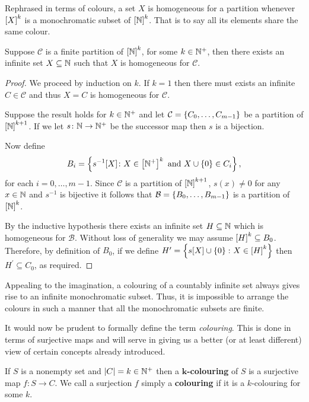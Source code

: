 Rephrased in terms of colours, a set $X$ is homogeneous for a partition whenever
$\subsets{k}{X}$ is a monochromatic subset of $\subsets{k}{\nats}$.  That is to
say all its elements share the same colour.

\begin{thm}
	Suppose $\mathcal{C}$ is a finite partition of $\subsets{k}{\nats}$, for
	some $k\in\posnats$, then there exists an infinite set $X\subseteq\nats$
	such that $X$ is homogeneous for $\mathcal{C}$.
\end{thm}
\begin{proof}
	We proceed by induction on $k$. If $k=1$ then there must exists an infinite
	$C\in\mathcal{C}$ and thus $X=C$ is homogeneous for $\mathcal{C}$.

	Suppose the result holds for $k\in\posnats$ and let
	$\mathcal{C}=\set{C_0,\dotsc,C_{m-1}}$ be a partition of
	$\subsets{k+1}{\nats}$.  If we let $s\colon\nats\to\posnats$
	be the successor map then $s$ is a bijection.

	Now define
	\begin{equation}
		B_i=\setbuild{s^{-1}[X]}{X\in\subsets{k}{\posnats}\text{ and
		}X\cup\set{0}\in C_i},
	\end{equation}
	for each $i=0,\dotsc,m-1$.  Since $\mathcal{C}$ is a partition of
	$\subsets{k+1}{\nats}$, $s(x)\neq 0$ for any $x\in\nats$ and $s^{-1}$ is
	bijective it follows that $\mathcal{B}=\set{B_0,\dotsc,B_{m-1}}$ is a
	partition of $\subsets{k}{\nats}$.

	By the inductive hypothesis there exists an infinite set $H\subseteq\nats$
	which is homogeneous for $\mathcal{B}$.  Without loss of generality we may
	assume $\subsets{k}{H}\subseteq B_0$.  Therefore, by definition of $B_0$,
	if we define $H^\prime=\setbuild{s[X]\cup\set{0}}{X\in\subsets{k}{H}}$ then
	$H^\prime\subseteq C_0$, as required.
\end{proof}

Appealing to the imagination, a colouring of a countably infinite set always
gives rise to an infinite monochromatic subset.  Thus, it is impossible to
arrange the colours in such a manner that all the monochromatic subsets are
finite.

It would now be prudent to formally define the term \textit{colouring}.  This is
done in terms of surjective maps and will serve in giving us a better (or at
least different) view of certain concepts already introduced.

\begin{dfn}[Colouring]\label{def:Col}
	If $S$ is a nonempty set and $\card{C}=k\in\posnats$ then a
	$\mathbf{k}$\textbf{-colouring} of $S$ is a surjective map $f\colon  S\to
	C$.  We call a surjection $f$ simply a \textbf{colouring} if it is a
	$k$-colouring for some $k$.
\end{dfn}

